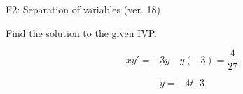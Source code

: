 \begin{exercise}
  \begin{exerciseTitle}F2: Separation of variables (ver. 18)\end{exerciseTitle}
  \begin{exerciseStatement}
    
Find the solution to the given IVP.

    
\[xy'= -3 y \hspace{1em} y( -3 ) = \frac{4}{27}\]

  \end{exerciseStatement}
  \begin{exerciseAnswer}
    
\[y= -4 t^ -3\]

  \end{exerciseAnswer}
\end{exercise}